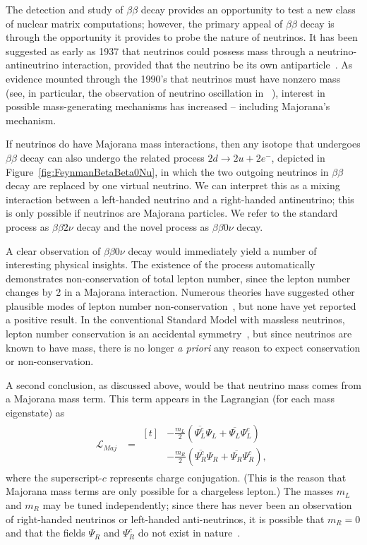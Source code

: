 The detection and study of $\beta\beta$ decay provides an opportunity to test a new class of nuclear matrix computations; however, the primary appeal of $\beta\beta$ decay is through the opportunity it provides to probe the nature of neutrinos.  It has been suggested as early as 1937 that neutrinos could possess mass through a neutrino-antineutrino interaction, provided that the neutrino be its own antiparticle~\cite{Majorana}.  As evidence mounted through the 1990's that neutrinos must have nonzero mass (see, in particular, the observation of neutrino oscillation in ~\cite{SuperK}), interest in possible mass-generating mechanisms has increased -- including Majorana's mechanism.

If neutrinos do have Majorana mass interactions, then any isotope that undergoes $\beta\beta$ decay can also undergo the related process $2d \rightarrow 2u + 2e^-$, depicted in Figure~\ref{fig:FeynmanBetaBeta0Nu}, in which the two outgoing neutrinos in $\beta\beta$ decay are replaced by one virtual neutrino.  We can interpret this as a mixing interaction between a left-handed neutrino and a right-handed antineutrino; this is only possible if neutrinos are Majorana particles.  We refer to the standard process as $\beta\beta 2\nu$ decay and the novel process as $\beta\beta 0\nu$ decay.

A clear observation of $\beta\beta 0\nu$ decay would immediately yield a number of interesting physical insights.  The existence of the process automatically demonstrates non-conservation of total lepton number, since the lepton number changes by 2 in a Majorana interaction.  Numerous theories have suggested other plausible modes of lepton number non-conservation~\cite{ProtonDecay}\cite{MuonToPositron}, but none have yet reported a positive result.  In the conventional Standard Model with massless neutrinos, lepton number conservation is an accidental symmetry~\cite{LeptonConservation}, but since neutrinos are known to have mass, there is no longer \textit{a priori} any reason to expect conservation or non-conservation.

A second conclusion, as discussed above, would be that neutrino mass comes from a Majorana mass term.  This term appears in the Lagrangian (for each mass eigenstate) as 
\begin{align}
\mathcal{L}_{Maj}&= \begin{aligned}[t]
 & -\frac{m_{L}}{2} \left( \overline{\Psi_L^c} \Psi_L^{} + \overline{\Psi_L^{}} \Psi_L^c \right)\\
 & -\frac{m_{R}}{2} \left( \overline{\Psi_R^c} \Psi_R^{} + \overline{\Psi_R^{}} \Psi_R^c \right),
\end{aligned}
\end{align}
where the superscript-$c$ represents charge conjugation.  (This is the reason that Majorana mass terms are only possible for a chargeless lepton.)  The masses $m_L$ and $m_R$ may be tuned independently; since there has never been an observation of right-handed neutrinos or left-handed anti-neutrinos, it is possible that $m_R = 0$ and that the fields $\Psi_R^{}$ and $\Psi_R^c$ do not exist in nature~\cite{RMPbb0n}.

